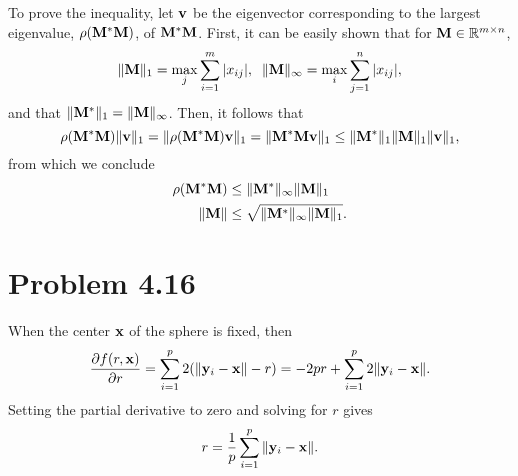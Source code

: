 \documentclass{scrartcl}
\begin{document}
To prove the inequality, let $\mathbf{v}$ be the eigenvector corresponding to
the largest eigenvalue, $\rho(\mathbf{M}^*\mathbf{M})$, of $\mathbf{M}^*\mathbf{M}$.
First, it can be easily shown that for $\mathbf{M} \in \mathbb{R}^{m\times n}$,
\begin{equation}
	\|\mathbf{M}\|_1 = \max_j \sum_{i=1}^m |x_{ij}|, \;\;
	\|\mathbf{M}\|_\infty = \max_i \sum_{j=1}^n |x_{ij}|,
\end{equation}
and that $\|\mathbf{M}^*\|_1 = \|\mathbf{M}\|_\infty$.
Then, it follows that
\begin{equation}
	\rho(\mathbf{M}^*\mathbf{M})\|\mathbf{v}\|_1
	= \|\rho(\mathbf{M}^*\mathbf{M})\mathbf{v}\|_1
	= \|\mathbf{M}^*\mathbf{M}\mathbf{v}\|_1
	\le \|\mathbf{M}^*\|_1 \|\mathbf{M}\|_1\|\mathbf{v}\|_1,
\end{equation}
from which we conclude
\begin{equation}
	\begin{split}
	\rho(\mathbf{M}^*\mathbf{M}) & \le \|\mathbf{M}^*\|_\infty \|\mathbf{M}\|_1 \\
	\|\mathbf{M}\| & \le \sqrt{\|\mathbf{M}^*\|_\infty \|\mathbf{M}\|_1}.
	\end{split}
\end{equation}






\section*{Problem 4.16}

When the center $\mathbf{x}$ of the sphere is fixed, then
\begin{equation}
	{\partial f(r, \mathbf{x}) \over \partial r}
	= \sum_{i=1}^p 2(\|\mathbf{y}_i-\mathbf{x}\|-r) 
	= - 2pr + \sum_{i=1}^p 2 \|\mathbf{y}_i-\mathbf{x}\| . 
\end{equation}
Setting the partial derivative to zero and solving for $r$ gives
\begin{equation}
	r = {1 \over p} \sum_{i=1}^p \| \mathbf{y}_i - \mathbf{x} \|.
\end{equation}
\end{document}
